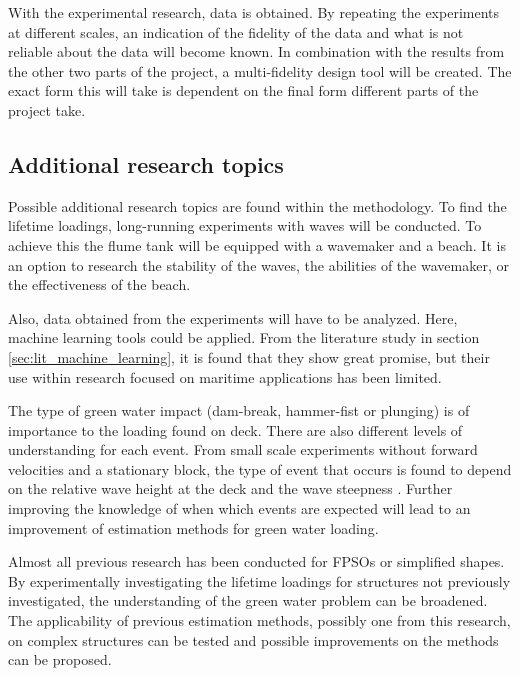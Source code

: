 \par 
With the experimental research, data is obtained. By repeating the experiments at different scales, an indication of the fidelity of the data and what is not reliable about the data will become known. In combination with the results from the other two parts of the project, a multi-fidelity design tool will be created. The exact form this will take is dependent on the final form different parts of the project take.

\subsection{Additional research topics}
\label{sec:additional_research_topics} 
Possible additional research topics are found within the methodology. To find the lifetime loadings, long-running experiments with waves will be conducted. To achieve this the flume tank will be equipped with a wavemaker and a beach. It is an option to research the stability of the waves, the abilities of the wavemaker, or the effectiveness of the beach. 
\par
Also, data obtained from the experiments will have to be analyzed. Here, machine learning tools could be applied. From the literature study in section \ref{sec:lit_machine_learning}, it is found that they show great promise, but their use within research focused on maritime applications has been limited.
\par 
The type of green water impact (dam-break, hammer-fist or plunging) is of importance to the loading found on deck. There are also different levels of understanding for each event. From small scale experiments without forward velocities and a stationary block, the type of event that occurs is found to depend on the relative wave height at the deck and the wave steepness \cite{Greco2013}. Further improving the knowledge of when which events are expected will lead to an improvement of estimation methods for green water loading.
\par 
Almost all previous research has been conducted for FPSOs or simplified shapes. By experimentally investigating the lifetime loadings for structures not previously investigated, the understanding of the green water problem can be broadened. The applicability of previous estimation methods, possibly one from this research, on complex structures can be tested and possible improvements on the methods can be proposed.



